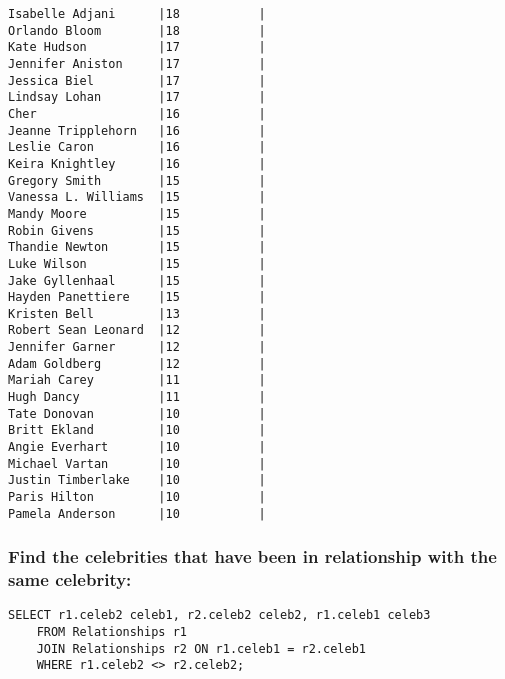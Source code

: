 \documentclass{article}
\begin{document}
\begin{verbatim}
Isabelle Adjani      |18           |
Orlando Bloom        |18           |
Kate Hudson          |17           |
Jennifer Aniston     |17           |
Jessica Biel         |17           |
Lindsay Lohan        |17           |
Cher                 |16           |
Jeanne Tripplehorn   |16           |
Leslie Caron         |16           |
Keira Knightley      |16           |
Gregory Smith        |15           |
Vanessa L. Williams  |15           |
Mandy Moore          |15           |
Robin Givens         |15           |
Thandie Newton       |15           |
Luke Wilson          |15           |
Jake Gyllenhaal      |15           |
Hayden Panettiere    |15           |
Kristen Bell         |13           |
Robert Sean Leonard  |12           |
Jennifer Garner      |12           |
Adam Goldberg        |12           |
Mariah Carey         |11           |
Hugh Dancy           |11           |
Tate Donovan         |10           |
Britt Ekland         |10           |
Angie Everhart       |10           |
Michael Vartan       |10           |
Justin Timberlake    |10           |
Paris Hilton         |10           |
Pamela Anderson      |10           |
        \end{verbatim}
    
    \subsubsection*{Find the celebrities that have been in relationship with the same celebrity:}
        \begin{verbatim}
SELECT r1.celeb2 celeb1, r2.celeb2 celeb2, r1.celeb1 celeb3
    FROM Relationships r1
    JOIN Relationships r2 ON r1.celeb1 = r2.celeb1
    WHERE r1.celeb2 <> r2.celeb2;\end{verbatim}
    
\end{document}
